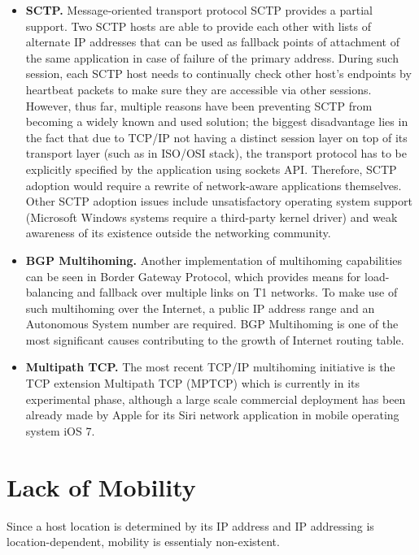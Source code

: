         \begin{itemize}
            \item \textbf{SCTP.}
            Message-oriented transport protocol SCTP provides a partial support. Two SCTP hosts are able to provide each other with lists of alternate IP addresses that can be used as fallback points of attachment of the same application in case of failure of the primary address. During such session, each SCTP host needs to continually check other host's endpoints by heartbeat packets to make sure they are accessible via other sessions.
            However, thus far, multiple reasons have been preventing SCTP from becoming a widely known and used solution; the biggest disadvantage lies in the fact that due to TCP/IP not having a distinct session layer on top of its transport layer (such as in ISO/OSI stack), the transport protocol has to be explicitly specified by the application using sockets API. Therefore, SCTP adoption would require a rewrite of network-aware applications themselves. Other SCTP adoption issues include unsatisfactory operating system support (Microsoft Windows systems require a third-party kernel driver) and weak awareness of its existence outside the networking community.

            \item \textbf{BGP Multihoming.} Another implementation of multihoming capabilities can be seen in Border Gateway Protocol, which provides means for load-balancing and fallback over multiple links on T1 networks. To make use of such multihoming over the Internet, a public IP address range and an Autonomous System number are required. BGP Multihoming is one of the most significant causes contributing to the growth of Internet routing table.

            \item \textbf{Multipath TCP.} The most recent TCP/IP multihoming initiative is the TCP extension Multipath TCP (MPTCP) which is currently in its experimental phase, although a large scale commercial deployment has been already made by Apple for its Siri network application in mobile operating system iOS 7.
        \end{itemize}

    \section{Lack of Mobility}\label{problems:mobility}

        Since a host location is determined by its IP address and IP addressing is location-dependent, mobility is essentialy non-existent.


